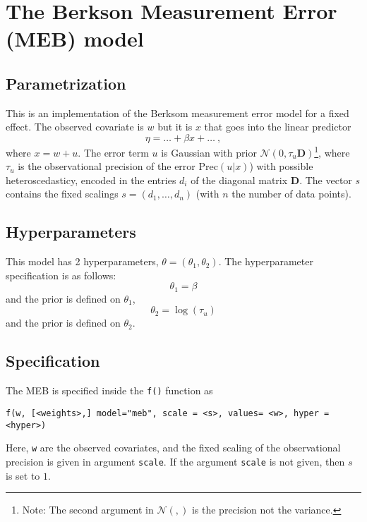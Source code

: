 \documentclass[a4paper,11pt]{article}
\begin{document}
\section*{The Berkson Measurement Error (MEB) model}

\subsection*{Parametrization}

This is an implementation of the Berksom measurement error model for a
fixed effect. The observed covariate is $w$ but it is $x$
that goes into the linear predictor
\begin{displaymath}
\eta = \ldots + \beta x + \ldots \ ,
\end{displaymath}
where $x = w + u$. The error term $u$ is Gaussian with prior $\mathcal{N}(0, \tau_u\mathbf{D})$\footnote{Note:
The second argument in ${\mathcal N}(,)$ is the precision not the
variance.}, where $\tau_u$ is the observational precision of the error $\text{Prec}(u|x)$) with possible heteroscedasticy, encoded in the entries $d_i$ of the diagonal matrix $\mathbf{D}$. The vector $s$ contains the fixed scalings $s=(d_1,\ldots,d_n)$ (with $n$ the number of data points).



\subsection*{Hyperparameters}

This model has 2 hyperparameters, $\theta = (\theta_{1}, \theta_{2})$.
The hyperparameter specification is as follows:
\begin{displaymath}
\theta_{1} = \beta
\end{displaymath}
and the prior is defined on $\theta_{1}$,
\begin{displaymath}
\theta_{2} = \log(\tau_u)
\end{displaymath}
and the prior is defined on $\theta_{2}$.

\subsection*{Specification}

The MEB is specified inside the {\tt f()}
function as
\begin{verbatim}
f(w, [<weights>,] model="meb", scale = <s>, values= <w>, hyper = <hyper>)
\end{verbatim}
Here, \texttt{w} are the observed covariates, and the fixed scaling of
the observational precision is given in argument \texttt{scale}. If
the argument \texttt{scale} is not given, then $s$ is set to $1$.
\end{document}
